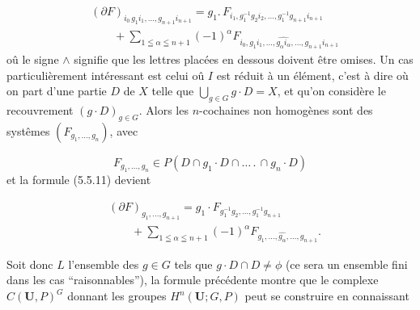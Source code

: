 \[
\tag{5.5.11}
\begin{aligned}
&(\partial F)_{i_0\,g_1i_1,\ldots,g_{n+1}i_{n+1}}
=g_1.\,F_{i_1,g_1^{-1}g_2i_2,\ldots,
g_1^{-1}g_{n+1}i_{n+1}}\\
&\qquad+\sum_{1\leqq\alpha\leqq n+1}(-1)^\alpha
F_{i_0,g_1i_1,\ldots,\widehat{g_\alpha i_\alpha},\ldots,
g_{n+1}i_{n+1}}
\end{aligned}
\]
oû le signe $\wedge$ signifie que les lettres
placées en dessous doivent être omises.
Un cas particulièrement intéressant est celui oû $I$ est réduit à un élément,
c'est à dire où on part d'une partie $D$ de $X$ telle que
$\displaystyle\bigcup_{g\in G}g\cdot D=X$, et qu'on considère le recouvrement
$(g\cdot D)_{g\in G}$. Alors les $n$-cochaines non homogènes sont des systêmes
$(F_{g_1,\ldots,g_n})$, avec

\[
F_{g_1,\ldots,g_n}\in
P(D\cap g_1\cdot D\cap\ldots\,.\,\cap g_n\cdot D)
\]
et la formule (5.5.11) devient

\[
\tag{5.5.11 bis}
\begin{aligned}
&(\partial F)_{g_1,\ldots,g_{n+1}}
=g_1\cdot F_{g_1^{-1}g_2,\ldots,g_1^{-1}g_{n+1}}\\
&\qquad+\sum_{1\leqq\alpha\leqq n+1}(-1)^\alpha
F_{g_1,\ldots,\widehat{g_\alpha},\ldots,g_{n+1}}.
\end{aligned}
\]

Soit donc $L$ l'ensemble des $g\in G$ tels que $g\cdot D\cap D\ne\phi$ (ce
sera un ensemble fini dans les cas ``raisonnables''), la formule précédente
montre que le complexe $C({\mathbf U},P)^G$ donnant les groupes
$H^n({\mathbf U};G,P)$ peut se construire en connaissant

